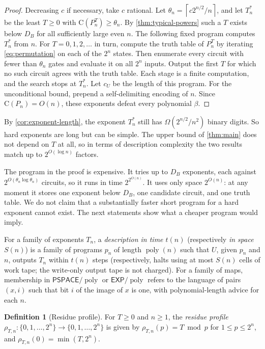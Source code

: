 \documentclass[11pt]{article}
\theoremstyle{definition}
\newtheorem{definition}[theorem]{Definition}
\theoremstyle{remark}
\newcommand{\CC}{\mathrm{C}}
\newcommand{\poly}{\operatorname{poly}}
\newcommand{\ceil}[1]{\left\lceil #1\right\rceil}
\numberwithin{equation}{section}
\begin{document}
\begin{proof}
Decreasing $c$ if necessary, take $c$ rational.  Let
$\theta_n=\ceil{c2^{n/2}/n}$, and let $T_n^*$ be the least $T\geq0$ with
$\CC(P_n^T)\geq\theta_n$.  By \cref{thm:typical-powers} such a $T$
exists below $D_B$ for all sufficiently large even $n$.  The following
fixed program computes $T_n^*$ from $n$.  For $T=0,1,2,\ldots$ in turn,
compute the truth table of $P_n^T$ by iterating \cref{eq:permutation}
on each of the $2^n$ states.  Then enumerate every circuit with fewer
than $\theta_n$ gates and evaluate it on all $2^n$ inputs.  Output the
first $T$ for which no such circuit agrees with the truth table.  Each
stage is a finite computation, and the search stops at $T_n^*$.  Let
$c_U$ be the length of this program.  For the unconditional bound,
prepend a self-delimiting encoding of $n$.  Since $\CC(P_n)=O(n)$,
these exponents defeat every polynomial $\beta$.
\end{proof}

By \cref{cor:exponent-length}, the exponent $T_n^*$ still has
$\Omega(2^{n/2}/n^2)$ binary digits.  So hard exponents are long but can
be simple.  The upper bound of \cref{thm:main} does not depend on $T$ at
all, so in terms of description complexity the two results match up to
$2^{O(\log n)}$ factors.

The program in the proof is expensive.  It tries up to $D_B$ exponents,
each against $2^{O(\theta_n\log\theta_n)}$ circuits, so it runs in time
$2^{2^{O(n)}}$.  It uses only space $2^{O(n)}$: at any moment it stores
one exponent below $D_B$, one candidate circuit, and one truth table.
We do not claim that a substantially faster short program for a hard
exponent cannot exist.  The next statements show what a cheaper program
would imply.

For a family of exponents $T_n$, a \emph{description in time $t(n)$}
(respectively \emph{in space $S(n)$}) is a family of programs $p_n$ of
length $\poly(n)$ such that $U$, given $p_n$ and $n$, outputs $T_n$
within $t(n)$ steps (respectively, halts using at most $S(n)$ cells of
work tape; the write-only output tape is not charged).  For a family of
maps, membership in $\mathsf{PSPACE}/\poly$ or $\mathsf{EXP}/\poly$
refers to the language of pairs $(x,i)$ such that bit $i$ of the image
of $x$ is one, with polynomial-length advice for each $n$.

\begin{definition}[Residue profile]
For $T\geq0$ and $n\geq1$, the \emph{residue profile}
$\rho_{T,n}:\{0,1,\ldots,2^n\}\to\{0,1,\ldots,2^n\}$ is given by
$\rho_{T,n}(p)=T\bmod p$ for $1\leq p\leq2^n$, and
$\rho_{T,n}(0)=\min(T,2^n)$.
\end{definition}
\end{document}
